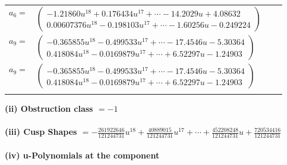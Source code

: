 \documentclass[1p]{elsarticle_modified}
\theoremstyle{definition}
\begin{document}
\begin{tabular}{m{7pt} m{180pt} m{7pt} m{180pt} }
\flushright $a_{6}=$&$\begin{pmatrix}-1.21860 u^{18}+0.176434 u^{17}+\cdots-14.2029 u+4.08632\\0.00607376 u^{18}-0.198103 u^{17}+\cdots-1.60256 u-0.249224\end{pmatrix}$ \\
\flushright $a_{9}=$&$\begin{pmatrix}-0.365855 u^{18}-0.499533 u^{17}+\cdots-17.4546 u-5.30364\\0.418084 u^{18}-0.0169879 u^{17}+\cdots+6.52297 u-1.24903\end{pmatrix}$\\ \flushright $a_{9}=$&$\begin{pmatrix}-0.365855 u^{18}-0.499533 u^{17}+\cdots-17.4546 u-5.30364\\0.418084 u^{18}-0.0169879 u^{17}+\cdots+6.52297 u-1.24903\end{pmatrix}$\\&\end{tabular}
\flushleft \textbf{(ii) Obstruction class $= -1$}\\~\\
\flushleft \textbf{(iii) Cusp Shapes $= -\frac{261922646}{121244731} u^{18}+\frac{40889015}{121244731} u^{17}+\cdots+\frac{452208248}{121244731} u+\frac{720534416}{121244731}$}\\~\\
\newpage\renewcommand{\arraystretch}{1}
\flushleft \textbf{(iv) u-Polynomials at the component}\newline \\
\end{document}
